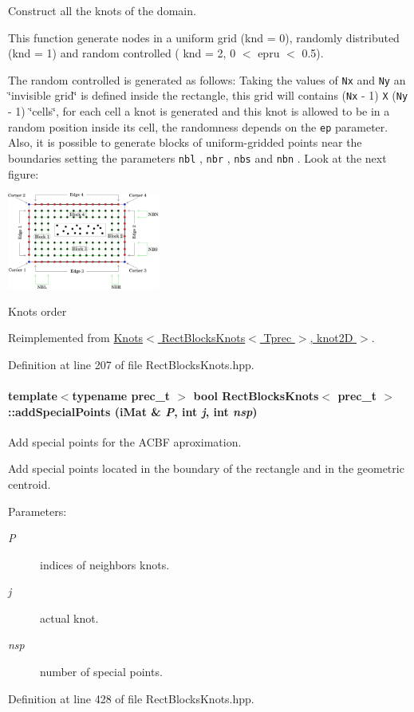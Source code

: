 Construct all the knots of the domain. 

This function generate nodes in a uniform grid (knd = 0), randomly distributed (knd = 1) and random controlled ( knd = 2, 0 $<$ epru $<$ 0.5).

The random controlled is generated as follows: Taking the values of {\tt Nx} and {\tt Ny} an \char`\"{}invisible grid\char`\"{} is defined inside the rectangle, this grid will contains ({\tt Nx} - 1) {\tt X} ({\tt Ny} - 1) \char`\"{}cells\char`\"{}, for each cell a knot is generated and this knot is allowed to be in a random position inside its cell, the randomness depends on the {\tt ep} parameter. Also, it is possible to generate blocks of uniform-gridded points near the boundaries setting the parameters {\tt nbl} , {\tt nbr} , {\tt nbs} and {\tt nbn} . Look at the next figure:  \begin{Image}
\begin{center}
\includegraphics[width=5cm]{RectBlocksKnots}\caption{Knots order}
\end{center}
\end{Image}
 

Reimplemented from \hyperlink{classKnots_8e622932aee837d4c3465093f3158ebb}{Knots$<$ RectBlocksKnots$<$ Tprec $>$, knot2D $>$}.

Definition at line 207 of file RectBlocksKnots.hpp.\hypertarget{classRectBlocksKnots_c159f6753592d796737579888eed6c6d}{
\paragraph[{addSpecialPoints}]{\setlength{\rightskip}{0pt plus 5cm}template$<$typename prec\_\-t $>$ bool {\bf RectBlocksKnots}$<$ prec\_\-t $>$::addSpecialPoints ({\bf iMat} \& {\em P}, \/  int {\em j}, \/  int {\em nsp})}\hfill}
\label{classRectBlocksKnots_c159f6753592d796737579888eed6c6d}


Add special points for the ACBF aproximation. 

Add special points located in the boundary of the rectangle and in the geometric centroid.

\begin{Desc}
\item[Parameters:]
\begin{description}
\item[{\em P}]indices of neighbors knots. \item[{\em j}]actual knot. \item[{\em nsp}]number of special points. \end{description}
\end{Desc}


Definition at line 428 of file RectBlocksKnots.hpp.